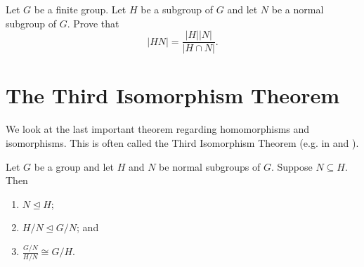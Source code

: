 \begin{exercise}\label{exercise-order-of-subgroup-product}
    Let $G$ be a finite group. Let $H$ be a subgroup of $G$ and let $N$ be a normal subgroup of $G$. Prove that
    \[
        |HN| = \frac{|H||N|}{|H \cap N|}.
    \]
\end{exercise}

\section{The Third Isomorphism Theorem}
We look at the last important theorem regarding homomorphisms and isomorphisms. This is often called the Third Isomorphism Theorem (e.g. in {\cite[Corollary I.5.10]{hungerford_1980}} and {\cite[pp.~253--254, Theorem 5]{cohn_1982}}).

\begin{theorem}\label{thrm-isomorphism-3}
    Let $G$ be a group and let $H$ and $N$ be normal subgroups of $G$. Suppose $N \subseteq H$. Then
    \begin{enumerate}
        \item $N \unlhd H$;
        \item $H/N \unlhd G/N$; and
        \item $\frac{G/N}{H/N} \cong G/H$.
    \end{enumerate}
\end{theorem}
